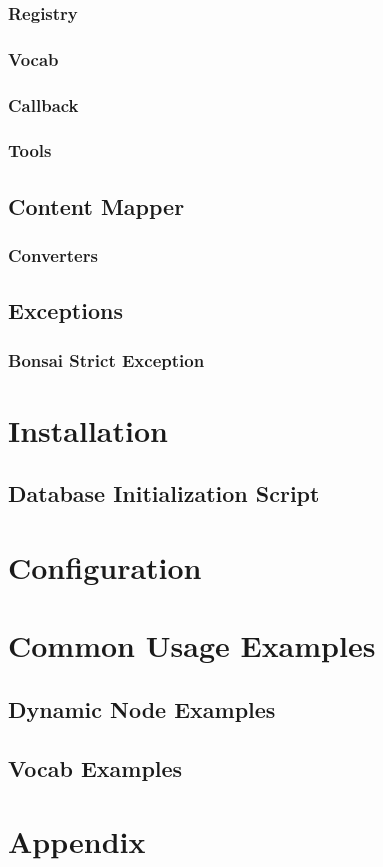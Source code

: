 \documentclass[]{book}
\begin{document}
\subsection{Registry}

\subsection{Vocab}

\subsection{Callback}

\subsection{Tools}

\section{Content Mapper}

\subsection{Converters}

\section{Exceptions}

\subsection{Bonsai Strict Exception}
\label{sec:bonsaiStructExecption}

\chapter{Installation}

\section{Database Initialization Script}
\label{sec:dbinit}

\chapter{Configuration}

\chapter{Common Usage Examples}
\label{chapter:commonUsageExamples}

\section{Dynamic Node Examples}
\label{sec:dynamicNode}

\section{Vocab Examples}
\label{sec:vocabExamples}

\chapter*{Appendix}
\end{document}
